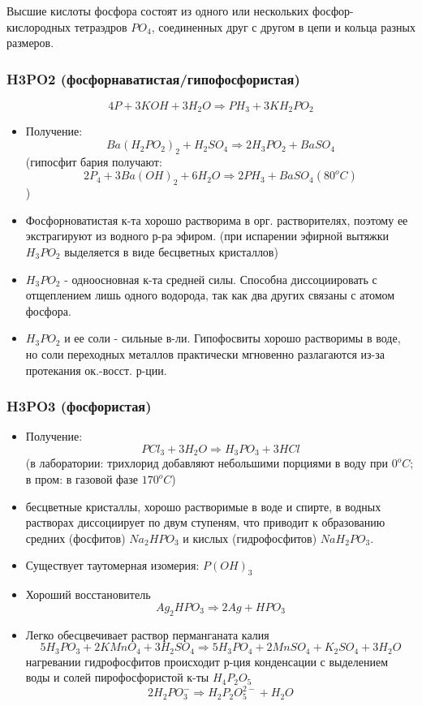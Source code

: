\documentclass[11pt]{article}
\begin{document}
Высшие кислоты фосфора состоят из одного или нескольких фосфор-кислородных тетраэдров $PO_4$, соединенных друг с другом в цепи и кольца разных размеров. 

\subsubsection{H3PO2 (фосфорнаватистая/гипофосфористая)} 
$$4 P + 3 KOH + 3 H_2O \Rightarrow PH_3 + 3 KH_2PO_2$$
\begin{itemize}
\item Получение:
 $$Ba(H_2PO_2)_2+H_2SO_4\Rightarrow2H_3PO_2+BaSO_4$$ 
(гипосфит бария получают: $$2P_4+3Ba(OH)_2+6H_2O\Rightarrow2PH_3+BaSO_4 (80^o C)$$)
\item Фосфорноватистая к-та хорошо растворима в орг. растворителях, поэтому ее экстрагируют из водного р-ра эфиром. (при испарении эфирной вытяжки $H_3PO_2$ выделяется в виде бесцветных кристаллов) 
\item $H_3PO_2$ - одноосновная к-та средней силы. Способна диссоциировать с отщеплением лишь одного водорода, так как два других связаны с атомом фосфора. 
 \item $H_3PO_2$ и ее соли - сильные в-ли. Гипофосвиты хорошо растворимы в воде, но соли переходных металлов практически мгновенно разлагаются из-за протекания ок.-восст. р-ции. 
\end{itemize}

\subsubsection{H3PO3 (фосфористая)} 
\begin{itemize}
\item Получение: $$PCl_3+3H_2O\Rightarrow H_3PO_3+3HCl$$ (в лаборатории: трихлорид добавляют небольшими порциями в воду при $0^oC$; в пром: в газовой фазе $170^oC$)
\item бесцветные кристаллы, хорошо растворимые в воде и спирте, в водных растворах диссоциирует по двум ступеням, что приводит к образованию средних (фосфитов) $Na_2HPO_3$ и кислых (гидрофосфитов) $NaH_2PO_3$.
\item Существует таутомерная изомерия: $P(OH)_3$ 
\item Хороший восстановитель $$Ag_2HPO_3\Rightarrow2Ag+HPO_3$$
\item Легко обесцвечивает раствор перманганата калия 
$$5H_3PO_3+2KMnO_4+3H_2SO_4\Rightarrow5H_3PO_4+2MnSO_4+K_2SO_4+3H_2O$$
 нагревании гидрофосфитов происходит р-ция конденсации с выделением воды и солей пирофосфористой к-ты $H_4P_2O_5$
$$2H_2PO_3^- \Rightarrow H_2P_2O_5^{2-} + H_2O$$
\end{itemize}
\end{document}

